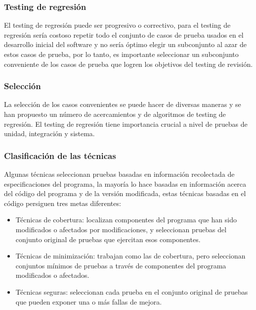 \documentclass[conference]{IEEEtran}
\begin{document}
\subsubsection{Testing de regresión}

 El testing de regresión puede ser progresivo o correctivo, para el testing de regresión sería costoso repetir todo el conjunto de casos de prueba usados en el desarrollo inicial del software y no sería óptimo elegir un subconjunto al azar de estos casos de prueba, por lo tanto, es importante seleccionar un subconjunto conveniente de los casos de prueba que logren los objetivos del testing de revisión.

\subsubsection{Selección}

 La selección de los casos convenientes se puede hacer de diversas maneras y se han propuesto un número de acercamientos y de algoritmos de testing de regresión. El testing de regresión tiene importancia crucial a nivel de pruebas de unidad, integración y sistema.

\subsubsection{Clasificación de las técnicas}
 
Algunas técnicas seleccionan pruebas basadas en información recolectada de especificaciones del programa, la mayoría lo hace basadas en información acerca del código del programa y de la versión modificada, estas técnicas basadas en el código persiguen tres metas diferentes:

\begin{itemize}
\item Técnicas de cobertura: localizan componentes del programa que han sido modificados o afectados por modificaciones, y seleccionan pruebas del conjunto original de pruebas que ejercitan esos componentes.

\item Técnicas de minimización: trabajan como las de cobertura, pero seleccionan conjuntos mínimos de pruebas a través de componentes del programa modificados o afectados. 

\item Técnicas seguras: seleccionan cada prueba en el conjunto original de pruebas que pueden exponer una o más fallas de mejora.
\end{itemize}
\end{document}
